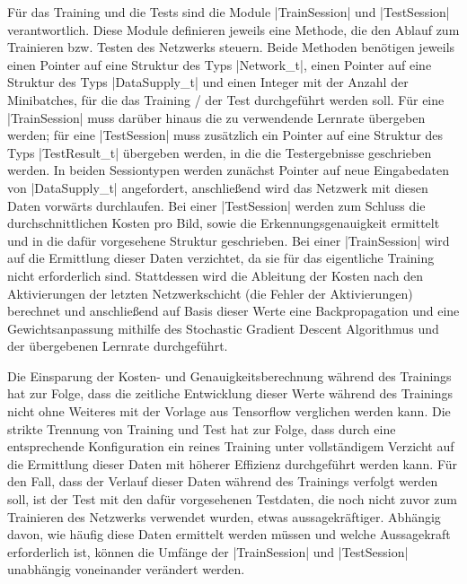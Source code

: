 \documentclass[../main.tex]{subfiles}
\begin{document}
Für das Training und die Tests sind die Module |TrainSession| und |TestSession| verantwortlich. Diese Module definieren jeweils eine Methode, die den Ablauf zum Trainieren bzw. Testen des Netzwerks steuern. Beide Methoden benötigen jeweils einen Pointer auf eine Struktur des Typs |Network_t|, einen Pointer auf eine Struktur des Typs |DataSupply_t| und einen Integer mit der Anzahl der Minibatches, für die das Training / der Test durchgeführt werden soll. Für eine |TrainSession| muss darüber hinaus die zu verwendende Lernrate übergeben werden; für eine |TestSession| muss zusätzlich ein Pointer auf eine Struktur des Typs |TestResult_t| übergeben werden, in die die Testergebnisse geschrieben werden. In beiden Sessiontypen werden zunächst Pointer auf neue Eingabedaten von |DataSupply_t| angefordert, anschließend wird das Netzwerk mit diesen Daten vorwärts durchlaufen. Bei einer |TestSession| werden zum Schluss die durchschnittlichen Kosten pro Bild, sowie die Erkennungsgenauigkeit ermittelt und in die dafür vorgesehene Struktur geschrieben. Bei einer |TrainSession| wird auf die Ermittlung dieser Daten verzichtet, da sie für das eigentliche Training nicht erforderlich sind. Stattdessen wird die Ableitung der Kosten nach den Aktivierungen der letzten Netzwerkschicht (die Fehler der Aktivierungen) berechnet und anschließend auf Basis dieser Werte eine Backpropagation und eine Gewichtsanpassung mithilfe des Stochastic Gradient Descent Algorithmus und der übergebenen Lernrate durchgeführt. 

Die Einsparung der Kosten- und Genauigkeitsberechnung während des Trainings hat zur Folge, dass die zeitliche Entwicklung dieser Werte während des Trainings nicht ohne Weiteres mit der Vorlage aus Tensorflow verglichen werden kann. Die strikte Trennung von Training und Test hat zur Folge, dass durch eine entsprechende Konfiguration ein reines Training unter vollständigem Verzicht auf die Ermittlung dieser Daten mit höherer Effizienz durchgeführt werden kann. Für den Fall, dass der Verlauf dieser Daten während des Trainings verfolgt werden soll, ist der Test mit den dafür vorgesehenen Testdaten, die noch nicht zuvor zum Trainieren des Netzwerks verwendet wurden, etwas aussagekräftiger. Abhängig davon, wie häufig diese Daten ermittelt werden müssen und welche Aussagekraft erforderlich ist, können die Umfänge der |TrainSession| und |TestSession| unabhängig voneinander verändert werden. 
\end{document}

